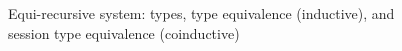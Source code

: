 \begin{figure}[tp]
\begin{mathpar}
  \end{mathpar}
  \caption{Equi-recursive system: types, type equivalence (inductive),
  and session type equivalence (coinductive)}
  \label{fig:equi-equivalence}
\end{figure}

